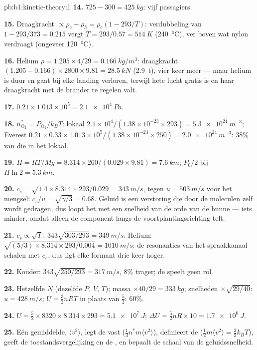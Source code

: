 \begin{solution}{pb:b1:kinetic-theory:1}
\textbf{14.} $725 - 300 = \qty{425}{kg}$: vijf passagiers.

\textbf{15.} Draagkracht $\propto \rho_c - \rho_h = \rho_c(1 - 293/T)$: verdubbeling van
$1 - 293/373 = 0.215$ vergt $T = 293/0.57 = \qty{514}{K}$ (\qty{240}{\degreeCelsius}),
ver boven wat nylon verdraagt (ongeveer \qty{120}{\degreeCelsius}).

\textbf{16.} Helium $\rho = 1.205 \times 4/29 = \qty{0.166}{kg/m^3}$: draagkracht
$(1.205 - 0.166) \times 2800 \times 9.81 = \qty{28.5}{kN}$ (\qty{2.9}{t}), vier
keer meer --- maar helium is duur en gaat bij elke landing verloren, terwijl
hete lucht gratis is en haar draagkracht met de brander te regelen valt.

\textbf{17.} $0.21 \times 1.013\times10^5 = \qty{2.1e4}{Pa}$.

\textbf{18.} $n^*_{\mathrm{O}_2} = P_{\mathrm{O}_2}/k_BT$: lokaal $2.1\times10^4/
(1.38\times10^{-23} \times 293) = \qty{5.3e24}{m^{-3}}$; Everest $0.21 \times 0.33
\times 1.013\times10^5/(1.38\times10^{-23} \times 250) = \qty{2.0e24}{m^{-3}}$:
$38\%$ van die in het lokaal.

\textbf{19.} $H = RT/Mg = 8.314 \times 260/(0.029 \times 9.81) = \qty{7.6}{km}$;
$P_0/2$ bij $H\ln 2 = \qty{5.3}{km}$.

\textbf{20.} $c_s = \sqrt{1.4 \times 8.314 \times 293/0.029} = \qty{343}{m/s}$,
tegen $u = \qty{503}{m/s}$ voor het mengsel: $c_s/u = \sqrt{\gamma/3} = 0.68$.
Geluid is een verstoring die door de moleculen zelf wordt gedragen, dus
loopt het met een snelheid van de orde van de hunne --- iets minder, omdat
alleen de component langs de voortplantingsrichting telt.

\textbf{21.} $c_s \propto \sqrt T$: $343\sqrt{303/293} = \qty{349}{m/s}$.
Helium: $\sqrt{(5/3) \times 8.314 \times 293/0.004} = \qty{1010}{m/s}$: de
resonanties van het spraakkanaal schalen met $c_s$, dus ligt elke formant
drie keer hoger.

\textbf{22.} Kouder: $343\sqrt{250/293} = \qty{317}{m/s}$, $8\%$ trager;
de  speelt geen rol.

\textbf{23.} Hetzelfde $N$ (dezelfde $P$, $V$, $T$); massa $\times 40/29 = \qty{333}{kg}$;
snelheden $\times\sqrt{29/40}$: $u = \qty{428}{m/s}$; $U = \tfrac32 nRT$ in plaats van
$\tfrac52$: $60\%$.

\textbf{24.} $U = \tfrac52 \times 8320 \times 8.314 \times 293 = \qty{5.1e7}{J}$;
$\Delta U = \tfrac52 nR \times 10 = \qty{1.7e6}{J}$.

\textbf{25.} Eén gemiddelde, $\langle v^2\rangle$, legt de  vast
($\tfrac13 n^*m\langle v^2\rangle$), definieert de 
($\tfrac12 m\langle v^2\rangle = \tfrac32 k_BT$), geeft de toestandsvergelijking
en de , en bepaalt de schaal van de geluidssnelheid.
\end{solution}
